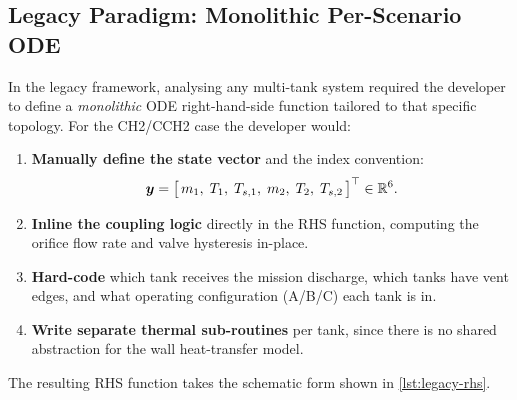 \subsection{Legacy Paradigm: Monolithic Per-Scenario ODE}
\label{sec:comparison:legacy}

In the legacy framework, analysing any multi-tank system required the developer
to define a \emph{monolithic} ODE right-hand-side function tailored to that
specific topology.  For the CH2/CCH2 case the developer would:

\begin{enumerate}[label=\arabic*.]
  \item \textbf{Manually define the state vector} and the index convention:
    \begin{equation}
      \bm{y} = \bigl[\,m_1,\; T_1,\; T_{s,1},\; m_2,\; T_2,\; T_{s,2}\,\bigr]^\top
      \in \mathbb{R}^6.
      \label{eq:legacy-state}
    \end{equation}
  \item \textbf{Inline the coupling logic} directly in the RHS function,
    computing the orifice flow rate and valve hysteresis in-place.
  \item \textbf{Hard-code} which tank receives the mission discharge, which
    tanks have vent edges, and what operating configuration (A/B/C) each tank
    is in.
  \item \textbf{Write separate thermal sub-routines} per tank, since there is
    no shared abstraction for the wall heat-transfer model.
\end{enumerate}

The resulting RHS function takes the schematic form shown in
\cref{lst:legacy-rhs}.

